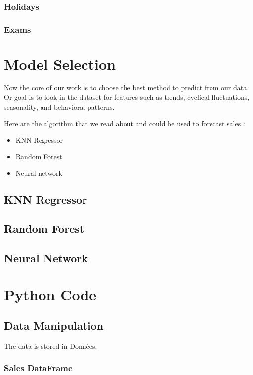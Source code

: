 \documentclass{report}
\begin{document}
\subsection{Holidays}

\subsection{Exams}


\chapter{Model Selection}

Now the core of our work is to choose the best method to predict from our data. Or goal is to look in the dataset for features such as trends, cyclical fluctuations, seasonality, and behavioral patterns.


Here are the algorithm that we read about and could be used to forecast sales :
\begin{itemize}
\item KNN Regressor
\item Random Forest
\item Neural network
\end{itemize}

\section{KNN Regressor}


\section{Random Forest}

\section{Neural Network}



\chapter{Python Code}

\section{Data Manipulation}
The data is stored in Données.\\

\subsection{Sales DataFrame}
\end{document}
